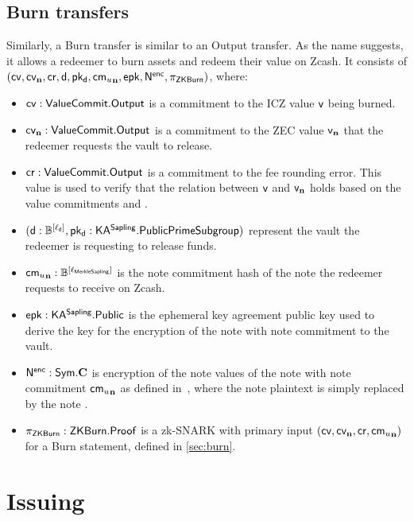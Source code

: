 \subsection{Burn transfers}
\label{sec:burn_transfers}
Similarly, a Burn transfer is similar to an Output transfer.
As the name suggests, it allows a redeemer to burn assets and redeem their value on Zcash.
It consists of $(\mathsf{cv}, \mathsf{cv_{\mathbf{n}}}, \mathsf{cr}, \mathsf{d}, \mathsf{pk_d}, \mathsf{{cm_{\mathnormal{u}}}_{\mathbf{n}}}, \mathsf{epk}, \mathsf{N^{enc}}, \pi_{\mathsf{ZKBurn}})$, where:
\begin{itemize}
    \item $\mathsf{cv} : \mathsf{ValueCommit}.\mathsf{Output}$ is a commitment to the ICZ value $\mathsf{v}$ being burned.
    
    \item $\mathsf{cv_{\mathbf{n}}} : \mathsf{ValueCommit}.\mathsf{Output}$ is a commitment to the ZEC value $\mathsf{v_{\mathbf{n}}}$ that the redeemer requests the vault to release.

    \item $\mathsf{cr} : \mathsf{ValueCommit}.\mathsf{Output}$ is a commitment to the fee rounding error.
    This value is used to verify that the relation between $\mathsf{v}$ and $\mathsf{v_{\mathbf{n}}}$ holds based on the value commitments \cv and \cvn.
    
    \item $(\mathsf{d} : \mathbb{B}^{[\ell_{\mathsf{d}}]}, \mathsf{pk_d} : \mathsf{KA^{Sapling}}.\mathsf{PublicPrimeSubgroup})$ represent the vault the redeemer is requesting to release funds.
    
    \item $\mathsf{{cm_{\mathnormal{u}}}_{\mathbf{n}}} : \mathbb{B}^{[\ell_{\mathsf{MerkleSapling}}]}$ is the note commitment hash of the note the redeemer requests to receive on Zcash.
    
    \item $\mathsf{epk} : \mathsf{KA^{Sapling}}.\mathsf{Public}$ is the ephemeral key agreement public key used to derive the key for the encryption of the note with note commitment \cmun to the vault.
    
    \item $\mathsf{N^{enc}} : \mathsf{Sym}.\mathbf{C}$ is encryption of the note values of the note with note commitment $\mathsf{{cm_{\mathnormal{u}}}_{\mathbf{n}}}$ as defined in~\cite[Section 4.17.1]{hopwood2016zcash}, where the note plaintext \np is simply replaced by the note \n.
    
    \item $\pi_{\mathsf{ZKBurn}} : \mathsf{ZKBurn}.\mathsf{Proof}$ is a \groth zk-SNARK with primary input $(\mathsf{cv}, \mathsf{cv_{\mathbf{n}}}, \mathsf{cr}, \mathsf{{cm_{\mathnormal{u}}}_{\mathbf{n}}})$ for a Burn statement, defined in \cref{sec:burn}.
\end{itemize}


\section{Issuing}
\label{sec:issuing}

